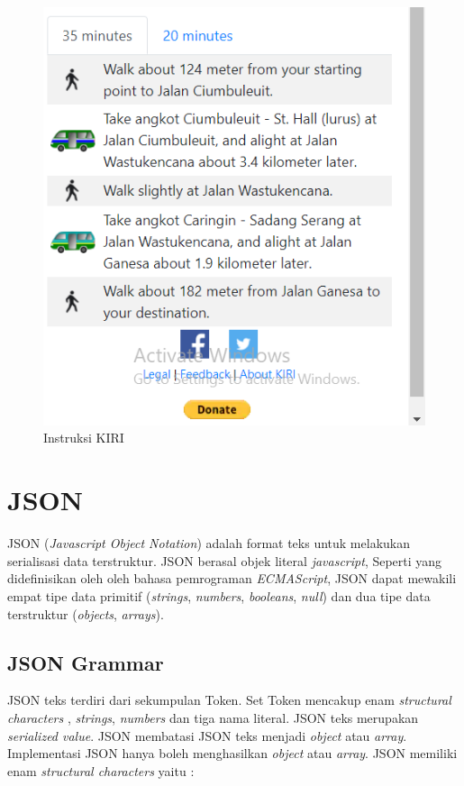 \begin{figure}[H]
	\centering
	\includegraphics[scale=0.3]{Gambar/instuksi.PNG}
	\caption{Instruksi KIRI}
	\label{fig:my_label}
\end{figure}
 



\section{JSON}
\label{subsec:json}
JSON (\textit{Javascript Object Notation}) adalah format teks untuk melakukan serialisasi data terstruktur\cite{RFC:7159}. JSON berasal objek literal \textit{javascript}, Seperti yang didefinisikan oleh oleh bahasa pemrograman \textit{ECMAScript}, JSON dapat mewakili empat tipe data primitif (\textit{strings}, \textit{numbers}, \textit{booleans}, \textit{null}) dan dua tipe data terstruktur (\textit{objects}, \textit{arrays}).

\subsection{ JSON Grammar}
JSON teks terdiri dari sekumpulan Token. Set Token mencakup enam \textit{structural characters }, \textit{strings}, \textit{numbers} dan tiga nama literal. JSON teks merupakan \textit{serialized value}. JSON membatasi JSON teks menjadi \textit{object} atau \textit{array}. Implementasi JSON hanya boleh menghasilkan \textit{object} atau \textit{array}. JSON memiliki enam \textit{structural characters} yaitu :

